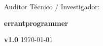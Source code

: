\documentclass[11pt,a4paper,oneside]{report}
\begin{document}
\begin{titlepage}
  \vfill
  
  \begin{minipage}{0.75\textwidth}
    \centering
    {\small \color{csecMuted} Auditor Técnico / Investigador:}\par
    \vspace{2pt}
    {\large \textbf{\color{csecDark} errantprogrammer}}\par
    \vspace{0.3cm}
    {\footnotesize \color{csecCyan}\textbf{v1.0} \quad \color{csecBorder}\textbar\quad \color{csecMuted}\today}
  \end{minipage}
  \vspace*{1cm}
\end{titlepage}

\end{document}
